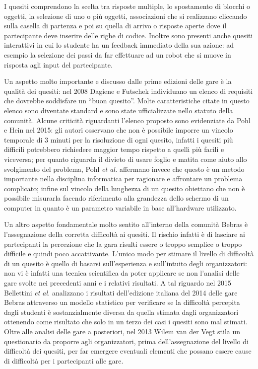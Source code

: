 \documentclass[12pt]{report}
\begin{document}
I quesiti comprendono la scelta tra risposte multiple, lo spostamento di blocchi o oggetti, la selezione di uno o più oggetti, associazioni che si realizzano cliccando sulla casella di partenza e poi su quella di arrivo o risposte aperte dove il partecipante deve inserire delle righe di codice.
Inoltre sono presenti anche quesiti interattivi in cui lo studente ha un feedback immediato della sua azione: ad esempio la selezione dei passi da far effettuare ad un robot che si muove in risposta agli input del partecipante.


Un aspetto molto importante e discusso dalle prime edizioni delle gare è la qualità dei quesiti: nel 2008 Dagiene e Futschek \cite{DagieneISEEP2008} individuano un elenco di requisiti che dovrebbe soddisfare un ``buon quesito''. Molte caratteristiche citate in questo elenco sono diventate standard e sono state ufficializzate nello statuto della comunità. Alcune criticità riguardanti l'elenco proposto sono evidenziate da Pohl e Hein \cite{PohlQuality}  nel 2015: gli autori osservano che non è possibile imporre un vincolo temporale di 3 minuti per la risoluzione di ogni quesito, infatti i quesiti più difficili potrebbero richiedere maggior tempo rispetto a quelli più facili e viceversa; per quanto riguarda il divieto di usare foglio e matita come aiuto allo svolgimento del problema, Pohl \textit{et al.} affermano invece che questo è un metodo importante nella disciplina informatica per ragionare e affrontare un problema complicato; infine sul vincolo della lunghezza di un quesito obiettano che non è possibile misurarla facendo riferimento alla grandezza dello schermo di un computer in quanto è un parametro variabile in base all'hardware utilizzato.

Un altro aspetto fondamentale molto sentito all'interno della comunità Bebras è l'assegnazione della corretta difficoltà ai quesiti. Il rischio infatti è di lasciare ai partecipanti la percezione che la gara risulti essere o troppo semplice o troppo difficile e quindi poco accattivante.
L'unico modo per stimare il livello di difficoltà di un quesito è quello di basarsi sull'esperienza e sull'intuito degli organizzatori: non vi è infatti una tecnica scientifica da poter applicare se non l'analisi delle gare svolte nei precedenti anni e i relativi risultati. A tal riguardo nel 2015 Bellettini \textit{et al.} \cite{BellettiniITICSE2015} analizzano i risultati dell'edizione italiana del 2014 delle gare Bebras attraverso un modello statistico per verificare se la difficoltà percepita dagli studenti è sostanzialmente diversa da quella stimata dagli organizzatori ottenendo come risultato che solo in un terzo dei casi i quesiti sono mal stimati. Oltre alle analisi delle gare a posteriori, nel 2013 Wilem van der Vegt \cite{WilemDifficulty} stila un questionario da proporre agli organizzatori, prima dell'assegnazione del livello di difficoltà dei quesiti, per far emergere eventuali elementi che possano essere cause di difficoltà per i partecipanti alle gare.
\end{document}
